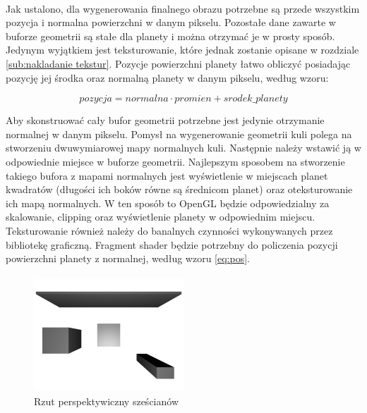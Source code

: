 \paragraph{}

Jak ustalono, dla wygenerowania finalnego obrazu potrzebne są przede wszystkim pozycja i normalna powierzchni w danym pikselu. Pozostałe dane zawarte w buforze geometrii są stałe dla planety i można otrzymać je w prosty sposób. Jedynym wyjątkiem jest teksturowanie, które jednak zostanie opisane w rozdziale \hyperref[sub:nakladanie tekstur]{\ref{sub:nakladanie tekstur}}. Pozycje powierzchni planety łatwo obliczyć posiadając pozycję jej środka oraz normalną planety w danym pikselu, według wzoru:

\begin{equation} \label{eq:pos}
pozycja = normalna \cdot promien + srodek\_planety
\end{equation}

Aby skonstruować cały bufor geometrii potrzebne jest jedynie otrzymanie normalnej w danym pikselu. Pomysł na wygenerowanie geometrii kuli polega na stworzeniu dwuwymiarowej mapy normalnych kuli. Następnie należy wstawić ją w odpowiednie miejsce w buforze geometrii. Najlepszym sposobem na stworzenie takiego bufora z mapami normalnych jest wyświetlenie w miejscach planet kwadratów (długości ich boków równe są średnicom planet) oraz oteksturowanie ich mapą normalnych. W ten sposób to OpenGL będzie odpowiedzialny za skalowanie, clipping oraz wyświetlenie planety w odpowiednim miejscu. Teksturowanie również należy do banalnych czynności wykonywanych przez bibliotekę graficzną. Fragment shader będzie potrzebny do policzenia pozycji powierzchni planety z normalnej, według wzoru \hyperref[eq:pos]{\ref{eq:pos}}.

\paragraph{}

\begin{figure}
\centering
	\includegraphics[width=0.5\textwidth]{img/proj_rend.jpg}
\caption{Rzut perspektywiczny sześcianów}
\label{fig:proj}
\end{figure}

